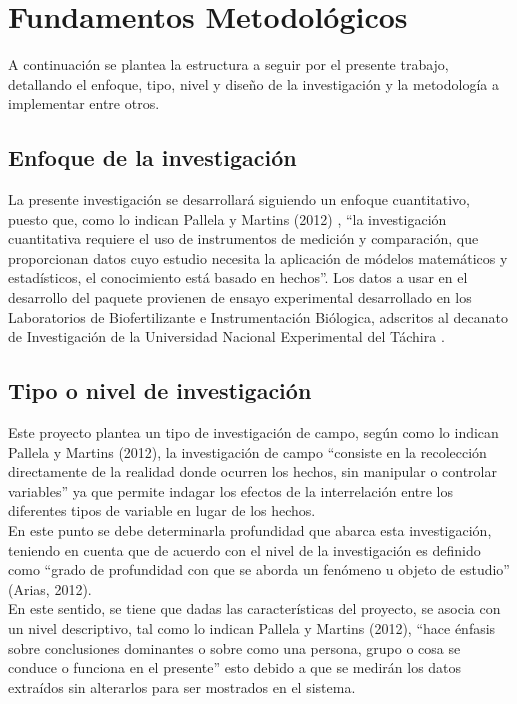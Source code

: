 \chapter{Fundamentos Metodol\'ogicos}

	A continuaci\'on se plantea la estructura a seguir por el presente trabajo, detallando el enfoque, tipo, nivel y dise\~no de la investigaci\'on y la metodolog\'ia a implementar entre otros.
	
\section{Enfoque de la investigaci\'on}
	
	La presente investigaci\'on se desarrollar\'a siguiendo un enfoque cuantitativo, puesto que, como lo indican Pallela y  Martins (2012) , “la investigaci\'on cuantitativa requiere el uso de instrumentos de medici\'on y comparaci\'on, que proporcionan datos cuyo estudio necesita la aplicaci\'on de m\'odelos matem\'aticos y estad\'isticos, el conocimiento est\'a basado en hechos”.  Los datos a usar en el desarrollo del paquete provienen de ensayo experimental desarrollado en los Laboratorios de Biofertilizante e Instrumentación Biólogica, adscritos al decanato de Investigación de la Universidad Nacional Experimental del Táchira .\\
	
\section{Tipo o nivel de investigaci\'on}
	
	Este proyecto plantea un tipo de investigaci\'on de campo, seg\'un como lo indican Pallela y  Martins (2012),  la investigaci\'on de campo “consiste en la recolecci\'on directamente de la realidad donde ocurren los hechos, sin manipular o controlar variables” ya que permite indagar los efectos de la interrelaci\'on entre los diferentes tipos de variable en lugar de los hechos.\\

	En este punto se debe determinarla profundidad que abarca esta investigaci\'on, teniendo en cuenta que de acuerdo con  el nivel de la investigaci\'on es definido como “grado de profundidad con que se aborda un fen\'omeno u objeto de estudio” (Arias, 2012).\\

	En este sentido, se tiene que dadas las caracter\'isticas del proyecto, se asocia con un nivel descriptivo, tal como lo indican Pallela y  Martins (2012),  “hace \'enfasis sobre conclusiones dominantes o sobre como una persona, grupo o cosa se conduce o funciona en el presente” esto debido a que se medir\'an los datos extra\'idos sin alterarlos para ser mostrados en el sistema.\\

